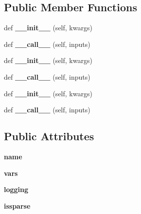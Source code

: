 \subsection*{Public Member Functions}
\begin{DoxyCompactItemize}
\item 
\mbox{\label{classgae_1_1layers_1_1Layer_a3bb55e286d78a7306f03661c894f4ad8}} 
def {\bfseries \+\_\+\+\_\+init\+\_\+\+\_\+} (self, kwargs)
\item 
\mbox{\label{classgae_1_1layers_1_1Layer_a92b6c409a553f7a18a6703d371d326f4}} 
def {\bfseries \+\_\+\+\_\+call\+\_\+\+\_\+} (self, inputs)
\item 
\mbox{\label{classgae_1_1layers_1_1Layer_a3bb55e286d78a7306f03661c894f4ad8}} 
def {\bfseries \+\_\+\+\_\+init\+\_\+\+\_\+} (self, kwargs)
\item 
\mbox{\label{classgae_1_1layers_1_1Layer_a92b6c409a553f7a18a6703d371d326f4}} 
def {\bfseries \+\_\+\+\_\+call\+\_\+\+\_\+} (self, inputs)
\item 
\mbox{\label{classgae_1_1layers_1_1Layer_a3bb55e286d78a7306f03661c894f4ad8}} 
def {\bfseries \+\_\+\+\_\+init\+\_\+\+\_\+} (self, kwargs)
\item 
\mbox{\label{classgae_1_1layers_1_1Layer_a92b6c409a553f7a18a6703d371d326f4}} 
def {\bfseries \+\_\+\+\_\+call\+\_\+\+\_\+} (self, inputs)
\end{DoxyCompactItemize}
\subsection*{Public Attributes}
\begin{DoxyCompactItemize}
\item 
\mbox{\label{classgae_1_1layers_1_1Layer_aeefccde0ad8a23281c2bb6229426bbd6}} 
{\bfseries name}
\item 
\mbox{\label{classgae_1_1layers_1_1Layer_acf4bc8ee72da7b70b299b93220eb0fc0}} 
{\bfseries vars}
\item 
\mbox{\label{classgae_1_1layers_1_1Layer_a3fbd71d17add88628c3b1c2464362871}} 
{\bfseries logging}
\item 
\mbox{\label{classgae_1_1layers_1_1Layer_a346475d832617c8149c4f5f9d0a27b7b}} 
{\bfseries issparse}
\end{DoxyCompactItemize}


